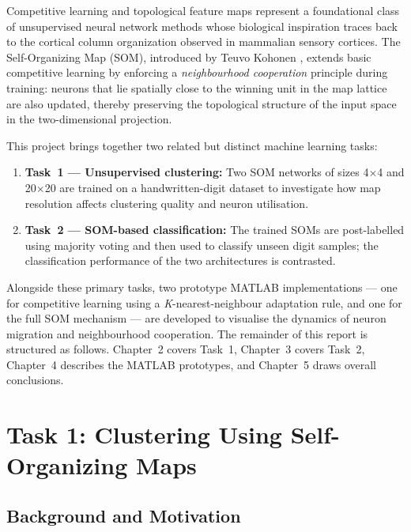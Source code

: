 \documentclass[12pt,a4paper]{report}
\begin{document}
Competitive learning and topological feature maps represent a foundational class of
unsupervised neural network methods whose biological inspiration traces back to the
cortical column organization observed in mammalian sensory cortices. The Self-Organizing
Map (SOM), introduced by Teuvo Kohonen \cite{kohonen1990}, extends basic competitive
learning by enforcing a \emph{neighbourhood cooperation} principle during training:
neurons that lie spatially close to the winning unit in the map lattice are also updated,
thereby preserving the topological structure of the input space in the two-dimensional
projection.

This project brings together two related but distinct machine learning tasks:

\begin{enumerate}
  \item \textbf{Task~1 — Unsupervised clustering:} Two SOM networks of sizes 4$\times$4
        and 20$\times$20 are trained on a handwritten-digit dataset to investigate how
        map resolution affects clustering quality and neuron utilisation.

  \item \textbf{Task~2 — SOM-based classification:} The trained SOMs are post-labelled
        using majority voting and then used to classify unseen digit samples; the
        classification performance of the two architectures is contrasted.
\end{enumerate}

Alongside these primary tasks, two prototype MATLAB implementations — one for
competitive learning using a \emph{K}-nearest-neighbour adaptation rule, and one for the
full SOM mechanism — are developed to visualise the dynamics of neuron migration and
neighbourhood cooperation. The remainder of this report is structured as follows.
Chapter~2 covers Task~1, Chapter~3 covers Task~2,
Chapter~4 describes the MATLAB prototypes, and
Chapter~5 draws overall conclusions.

\chapter{Task 1: Clustering Using Self-Organizing Maps}
\label{ch:som_cluster}

\section{Background and Motivation}
\end{document}
